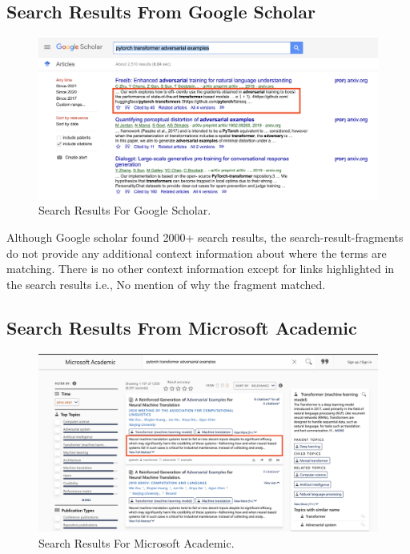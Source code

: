 \subsection{Search Results From Google Scholar}
\label{sr-g}

\begin{figure}[h]
    \centering
    \includegraphics[width=\maxwidth{\textwidth}]{src/images/google-scholar-example.png}
    \caption{Search Results For Google Scholar. }
    \label{figure\arabic{figurecounter}}
\end{figure}
Although Google scholar found 2000+ search results, the search-result-fragments do not provide any additional context information about where the terms are matching.  There is no other context information except for links highlighted in the search results i.e., No mention of why the fragment matched. 

\pagebreak
\subsection{Search Results From Microsoft Academic}
\label{sr-m}
\begin{figure}[h]
    \centering
    \includegraphics[width=\maxwidth{\textwidth}]{src/images/academic-example.png}
    \caption{Search Results For Microsoft Academic. }
    \label{figure\arabic{figurecounter}}
\end{figure}

